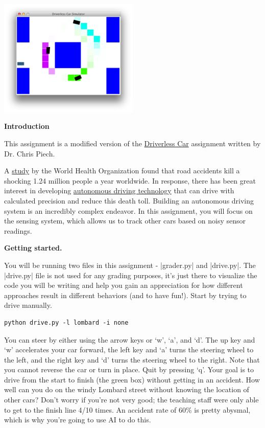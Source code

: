 
\begin{center}
\includegraphics[width=0.5\textwidth]{media/car3.png}
\end{center}

{\bf Introduction}

This assignment is a modified version of the
\href{http://stanford.edu/~cpiech/cs221/homework/prog/driverlessCar/driverlessCar.html}
{Driverless Car} assignment written by Dr. Chris Piech.

A \href{http://en.mercopress.com/2013/03/18/in-2010-there-were-1.24-million-road-traffic-related-deaths-worldwide-says-who-report}
{study} by the World Health Organization found that road accidents kill a
shocking 1.24 million people a year worldwide. In response, there has been great
interest in developing \href{https://en.wikipedia.org/wiki/Autonomous_car}
{autonomous driving technology} that can drive with calculated precision and
reduce this death toll. Building an autonomous driving system is an incredibly
complex endeavor. In this assignment, you will focus on the sensing system,
which allows us to track other cars based on noisy sensor readings.
\clearpage

{\bf Getting started.}

You will be running two files in this assignment - |grader.py| and |drive.py|.
The |drive.py| file is not used for any grading purposes, it's just there to
visualize the code you will be writing and help you gain an appreciation for how
different approaches result in different behaviors (and to have fun!). Start by
trying to drive manually.

\begin{lstlisting}
python drive.py -l lombard -i none
\end{lstlisting}

You can steer by either using the arrow keys or `w', `a', and `d'. The up key
and `w' accelerates your car forward, the left key and `a' turns the steering
wheel to the left, and the right key and `d' turns the steering wheel to the
right. Note that you cannot reverse the car or turn in place. Quit by pressing
`q'. Your goal is to drive from the start to finish (the green box) without
getting in an accident. How well can you do on the windy Lombard street without
knowing the location of other cars?  Don't worry if you're not very good; the
teaching staff were only able to get to the finish line 4/10 times.  An accident
rate of 60\% is pretty abysmal, which is why you're going to use AI to do this. 


